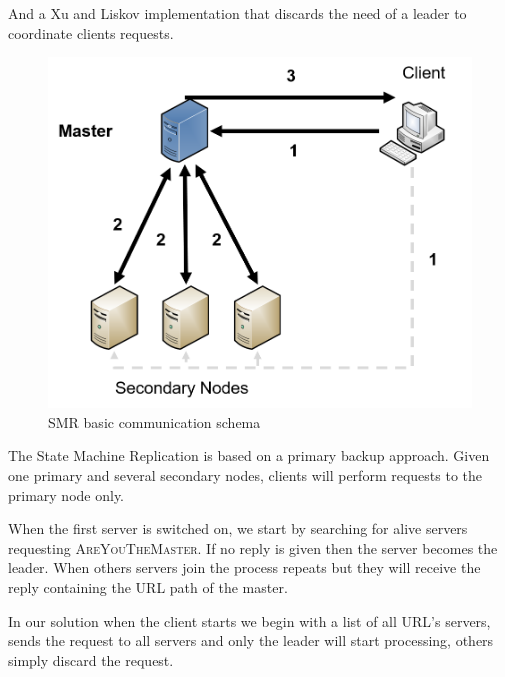 \documentclass[times, 10pt,twocolumn]{article}
\begin{document}
And a Xu and Liskov implementation that discards the need of a leader to
coordinate clients requests.



\begin{figure}
   \includegraphics[width=\linewidth]{smr_basic.png}
   \caption{SMR basic communication schema}
   \label{fig:smr_basic}
 \end{figure}


The State Machine Replication is based on a primary backup approach. Given one
primary and several secondary nodes, clients will perform requests to the
primary node only.

When the first server is switched on, we start by searching for alive servers
requesting \textsc{AreYouTheMaster}. If no reply is given then the server
becomes the leader. When others servers join the process repeats but they
will receive the reply containing the URL path of the master.


In our solution when the client starts we begin with a list of all URL's servers,
sends the request to all servers and only the leader will start processing, others
simply discard the request.

\end{document}
